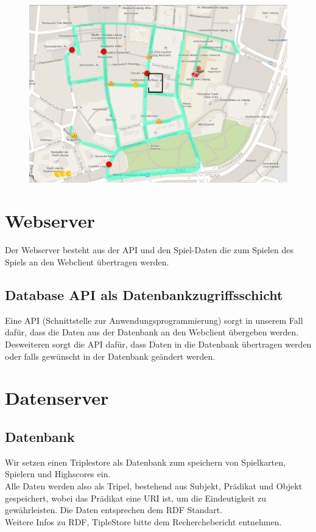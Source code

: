 \documentclass{article}
\begin{document}
\begin{figure}[H]
  \centering
  \includegraphics[scale=0.3]{pacman.png}
  \label{PNFs}
\end{figure} 



\section{Webserver}
Der Webserver besteht aus der API und den Spiel-Daten die zum Spielen des Spiels an den Webclient übertragen werden.

\subsection{Database API als Datenbankzugriffsschicht}
Eine API (Schnittstelle zur Anwendungsprogrammierung) sorgt in unserem Fall dafür, dass die Daten aus der Datenbank an den Webclient übergeben werden. \\
Desweiteren sorgt die API dafür, dass Daten in die Datenbank übertragen werden oder falls gewünscht in der Datenbank geändert werden.  

\section{Datenserver}
\subsection{Datenbank}
Wir setzen einen Triplestore als Datenbank zum speichern von Spielkarten, Spielern und Highscores ein. \\
Alle Daten werden also als Tripel, bestehend aus Subjekt, Prädikat  
und Objekt gespeichert, wobei das Prädikat eine URI ist, um die Eindeutigkeit zu gewährleisten. Die Daten entsprechen dem RDF Standart. \\
Weitere Infos zu RDF, TipleStore bitte dem Recherchebericht entnehmen.
\end{document}
